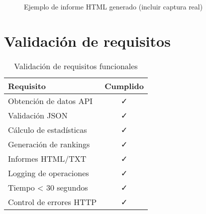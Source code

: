 \begin{figure}[H]
  \centering
  \caption{Ejemplo de informe HTML generado (incluir captura real)}
  \label{fig:informe-html}
\end{figure}

\section{Validación de requisitos}

\begin{table}[H]
  \centering
  \begin{tabular}{@{}lc@{}}
    \toprule
    \textbf{Requisito}      & \textbf{Cumplido} \\ \midrule
    Obtención de datos API  & ✓                 \\
    Validación JSON         & ✓                 \\
    Cálculo de estadísticas & ✓                 \\
    Generación de rankings  & ✓                 \\
    Informes HTML/TXT       & ✓                 \\
    Logging de operaciones  & ✓                 \\
    Tiempo < 30 segundos    & ✓                 \\
    Control de errores HTTP & ✓                 \\ \bottomrule
  \end{tabular}
  \caption{Validación de requisitos funcionales}
  \label{tab:validacion}
\end{table}
